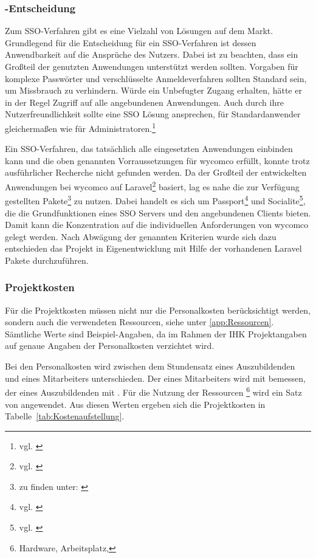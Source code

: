 \subsubsection{-Entscheidung}
\label{sec:MakeOrBuyEntscheidung}

Zum \ac{SSO}-Verfahren gibt es eine Vielzahl von Lösungen auf dem Markt.
Grundlegend für die Entscheidung für ein \ac{SSO}-Verfahren ist dessen Anwendbarkeit auf die Ansprüche des Nutzers. Dabei ist zu beachten, dass ein Großteil der genutzten Anwendungen unterstützt werden sollten. Vorgaben für komplexe Passwörter und verschlüsselte Anmeldeverfahren sollten Standard sein, um Missbrauch zu verhindern. Würde ein Unbefugter Zugang erhalten, hätte er in der Regel Zugriff auf alle angebundenen Anwendungen. Auch durch ihre Nutzerfreundlichkeit sollte eine \acs{SSO} Lösung ansprechen, für Standardanwender gleichermaßen wie für Administratoren.\footnote{vgl. \cite{computerwoche}}

Ein \ac{SSO}-Verfahren, das tatsächlich alle eingesetzten Anwendungen einbinden kann und die oben genannten Vorraussetzungen für wycomco erfüllt, konnte trotz ausführlicher Recherche nicht gefunden werden. Da der Großteil der entwickelten Anwendungen bei wycomco auf Laravel\footnote{vgl. \cite{Laravel}} basiert, lag es nahe die zur Verfügung gestellten Pakete\footnote{zu finden unter: \cite{pakete}} zu nutzen. Dabei handelt es sich um Passport\footnote{vgl. \cite{Passport}} und Socialite\footnote{vgl. \cite{Socialite}}, die die Grundfunktionen eines SSO Servers und den angebundenen Clients bieten. Damit kann die Konzentration auf die individuellen Anforderungen von wycomco gelegt werden. Nach Abwägung der genannten Kriterien wurde sich dazu entschieden das Projekt in Eigenentwicklung mit Hilfe der vorhandenen Laravel Pakete durchzuführen.

\subsubsection{Projektkosten}
\label{sec:Projektkosten}

Für die Projektkosten müssen nicht nur die Personalkosten berücksichtigt werden, sondern auch die verwendeten Ressourcen, siehe unter \ref{app:Ressourcen}. Sämtliche Werte sind Beispiel-Angaben, da im Rahmen der IHK Projektangaben auf genaue Angaben der Personalkosten verzichtet wird. 

Bei den Personalkosten wird zwischen dem Stundensatz eines Auszubildenden und eines Mitarbeiters unterschieden. Der eines Mitarbeiters wird mit  bemessen, der eines Auszubildenden mit .
Für die Nutzung der Ressourcen \footnote{Hardware, Arbeitsplatz, \etc} wird ein Satz von  angewendet.
Aus diesen Werten ergeben sich die Projektkosten in Tabelle~\ref{tab:Kostenaufstellung}.


